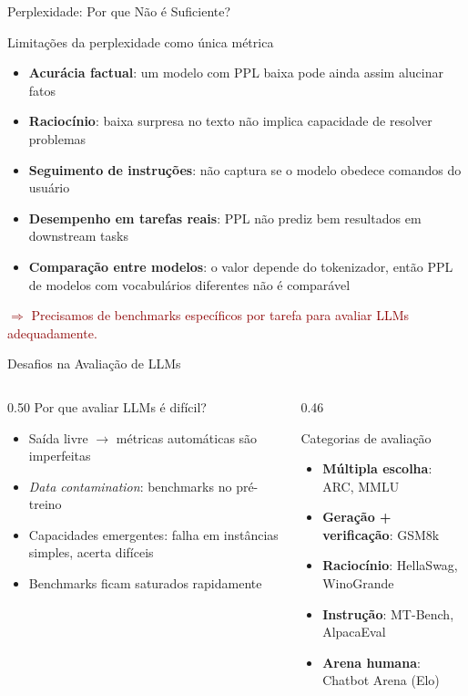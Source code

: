 \documentclass[aspectratio=169, xcolor=dvipsnames]{beamer}
\begin{document}
  \begin{frame}{Perplexidade: Por que Não é Suficiente?}
    \begin{alertblock}{Limitações da perplexidade como única métrica}
      \begin{itemize}
        \item \textbf{Acurácia factual}: um modelo com PPL baixa pode ainda assim alucinar fatos
        \item \textbf{Raciocínio}: baixa surpresa no texto não implica capacidade de resolver problemas
        \item \textbf{Seguimento de instruções}: não captura se o modelo obedece comandos do usuário
        \item \textbf{Desempenho em tarefas reais}: PPL não prediz bem resultados em downstream tasks
        \item \textbf{Comparação entre modelos}: o valor depende do tokenizador, então PPL de modelos com vocabulários diferentes não é comparável
      \end{itemize}
    \end{alertblock}
    \vspace{0.5em}
    \textcolor{DarkRed}{$\Rightarrow$ Precisamos de benchmarks específicos por tarefa para avaliar LLMs adequadamente.}
  \end{frame}

  \begin{frame}{Desafios na Avaliação de LLMs}
    \begin{columns}[T]
      \begin{column}{0.50\textwidth}
        Por que avaliar LLMs é difícil?
        \begin{itemize}
          \item Saída livre $\to$ métricas automáticas são imperfeitas
          \item \textit{Data contamination}: benchmarks no pré-treino
          \item Capacidades emergentes: falha em instâncias simples, acerta difíceis
          \item Benchmarks ficam saturados rapidamente
        \end{itemize}
      \end{column}
      \begin{column}{0.46\textwidth}
        \begin{block}{Categorias de avaliação}
          \begin{itemize}
            \item \textbf{Múltipla escolha}: ARC, MMLU
            \item \textbf{Geração + verificação}: GSM8k
            \item \textbf{Raciocínio}: HellaSwag, WinoGrande
            \item \textbf{Instrução}: MT-Bench, AlpacaEval
            \item \textbf{Arena humana}: Chatbot Arena (Elo)
          \end{itemize}
        \end{block}
      \end{column}
    \end{columns}
  \end{frame}
\end{document}
